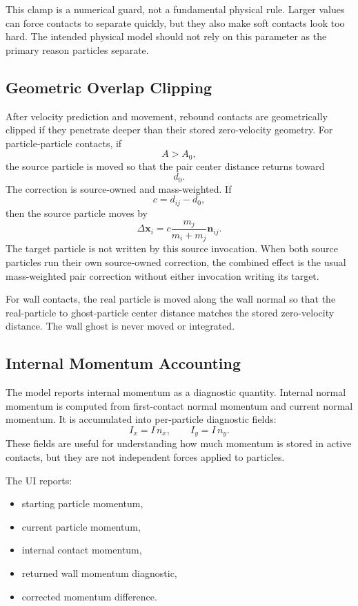 This clamp is a numerical guard, not a fundamental physical rule.  Larger
values can force contacts to separate quickly, but they also make soft contacts
look too hard.  The intended physical model should not rely on this parameter
as the primary reason particles separate.

\subsection{Geometric Overlap Clipping}

After velocity prediction and movement, rebound contacts are geometrically
clipped if they penetrate deeper than their stored zero-velocity geometry.  For
particle-particle contacts, if
\[
    A > A_0,
\]
the source particle is moved so that the pair center distance returns toward
\[
    d_0 .
\]
The correction is source-owned and mass-weighted.  If
\[
    c = d_{ij} - d_0,
\]
then the source particle moves by
\[
    \Delta \mathbf{x}_i
    =
    c
    \frac{m_j}{m_i + m_j}
    \mathbf{n}_{ij}.
\]
The target particle is not written by this source invocation.  When both source
particles run their own source-owned correction, the combined effect is the
usual mass-weighted pair correction without either invocation writing its
target.

For wall contacts, the real particle is moved along the wall normal so that the
real-particle to ghost-particle center distance matches the stored
zero-velocity distance.  The wall ghost is never moved or integrated.

\subsection{Internal Momentum Accounting}

The model reports internal momentum as a diagnostic quantity.  Internal normal
momentum is computed from first-contact normal momentum and current normal
momentum.  It is accumulated into per-particle diagnostic fields:
\[
    I_x = I\,n_x,
    \qquad
    I_y = I\,n_y .
\]
These fields are useful for understanding how much momentum is stored in active
contacts, but they are not independent forces applied to particles.

The UI reports:
\begin{itemize}
    \item starting particle momentum,
    \item current particle momentum,
    \item internal contact momentum,
    \item returned wall momentum diagnostic,
    \item corrected momentum difference.
\end{itemize}

